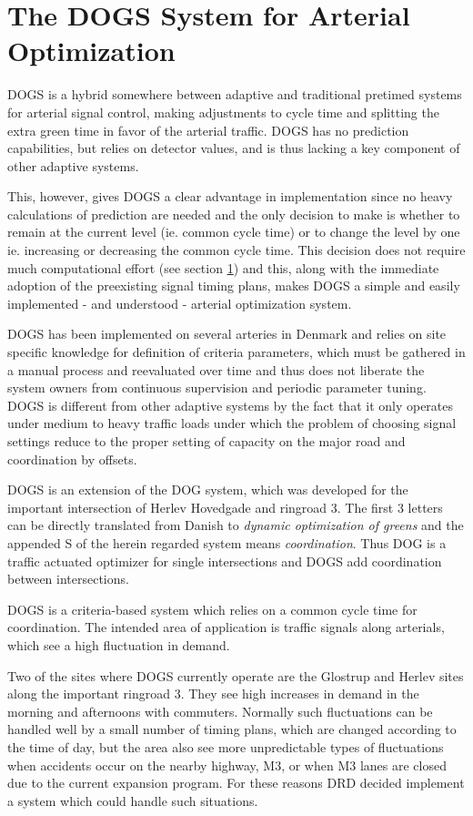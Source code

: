 \section{The DOGS System for Arterial Optimization}
\label{dogs}

DOGS is a hybrid somewhere between adaptive and traditional pretimed systems for arterial signal control, making adjustments to cycle time and splitting the extra green time in favor of the arterial traffic. DOGS has no prediction capabilities, but relies on detector values, and is thus lacking a key component of other adaptive systems. 

This, however, gives DOGS a clear advantage in implementation since no heavy calculations of prediction are needed and the only decision to make is whether to remain at the current level (ie. common cycle time) or to change the level by one ie. increasing or decreasing the common cycle time. This decision does not require much computational effort (see section \ref{dogs}) and this, along with the immediate adoption of the preexisting signal timing plans, makes DOGS a simple and easily implemented - and understood - arterial optimization system.

DOGS has been implemented on several arteries in Denmark and relies on site specific knowledge for definition of criteria parameters, which must be gathered in a manual process and reevaluated over time and thus does not liberate the system owners from continuous supervision and periodic parameter tuning.
DOGS is different from other adaptive systems by the fact that it only operates under medium to heavy traffic loads under which the problem of choosing signal settings reduce to the proper setting of capacity on the major road and coordination by offsets.

DOGS is an extension of the DOG system, which was developed for the important intersection of Herlev Hovedgade and ringroad 3. The first 3 letters can be directly translated from Danish to \textit{dynamic optimization of greens} and the appended S of the herein regarded system means \textit{coordination}. Thus DOG is a traffic actuated optimizer for single intersections and DOGS add coordination between intersections.

DOGS is a criteria-based system which relies on a common cycle time for coordination. The intended area of application is traffic signals along arterials, which see a high fluctuation in demand. 

Two of the sites where DOGS currently operate are the Glostrup and Herlev sites along the important ringroad 3. They see high increases in demand in the morning and afternoons with commuters. Normally such fluctuations can be handled well by a small number of timing plans, which are changed according to the time of day, but the area also see more unpredictable types of fluctuations when accidents occur on the nearby highway, M3, or when M3 lanes are closed due to the current expansion program. For these reasons DRD decided implement a system which could handle such situations.

